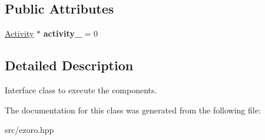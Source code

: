 \subsection*{Public Attributes}
\begin{DoxyCompactItemize}
\item 
\hypertarget{classcoco_1_1_runnable_interface_a3b586c5a1bbf2c11351b16fc53adad78}{\hyperlink{classcoco_1_1_activity}{Activity} $\ast$ {\bfseries activity\-\_\-} = 0}\label{classcoco_1_1_runnable_interface_a3b586c5a1bbf2c11351b16fc53adad78}

\end{DoxyCompactItemize}


\subsection{Detailed Description}
Interface class to execute the components. 

The documentation for this class was generated from the following file\-:\begin{DoxyCompactItemize}
\item 
src/ezoro.\-hpp\end{DoxyCompactItemize}
